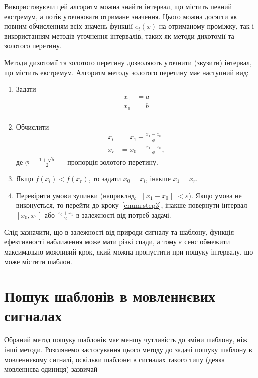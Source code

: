         Використовуючи цей алгоритм можна знайти інтервал, що містить певний екстремум, а потів уточнювати отримане
        значення.
        Цього можна досягти як повним обчисленням всіх значень функції $e_t(x)$ на отриманому проміжку, так і
        використанням методів уточнення інтервалів, таких як методи дихотомії та золотого перетину.

        Методи дихотомії та золотого перетину дозволяють уточнити (звузити) інтервал, що містить екстремум.
        Алгоритм методу золотого перетину має наступний вид:
        \begin{enumerate}
            \item Задати
                \begin{align*}
                    x_0 &= a\\
                    x_1 &= b\\
                \end{align*}
            \item Обчислити
                \begin{align*}
                    x_l &= x_1 - \frac{x_1 - x_0}{\phi}\\
                    x_r &= x_0 + \frac{x_1 - x_0}{\phi},
                \end{align*}
                де $\phi = \frac{1 + \sqrt{ 5 }}{2}$ --- пропорція золотого перетину.
            \item\label{enum:step3} Якщо $f(x_l) < f(x_r)$, то задати $x_0 = x_l$, інакше $x_1 = x_r$.
            \item Перевірити умови зупинки (наприклад, $\|x_1 - x_0\| < \varepsilon$).
                Якщо умова не виконується, то перейти до кроку~\ref{enum:step3}, інакше повернути інтервал ${[x_0,
                    x_1]}$ або $\frac{x_0+x_1}{2}$ в залежності від потреб задачі.
        \end{enumerate}

        Слід зазначити, що в залежності від природи сигналу та шаблону, функція ефективності наближення може мати
        різкі спади, а тому є сенс обмежити максимально можливий крок, який можна пропустити при пошуку інтервалу, що
        може містити шаблон.
\section{Пошук шаблонів в мовленнєвих сигналах}
    Обраний метод пошуку шаблонів має меншу чутливість до зміни шаблону, ніж інші методи.
    Розглянемо застосування цього методу до задачі пошуку шаблону в мовленнєвому сигналі, оскільки шаблони в сигналах
    такого типу (деяка мовленнєва одиниця) зазвичай

